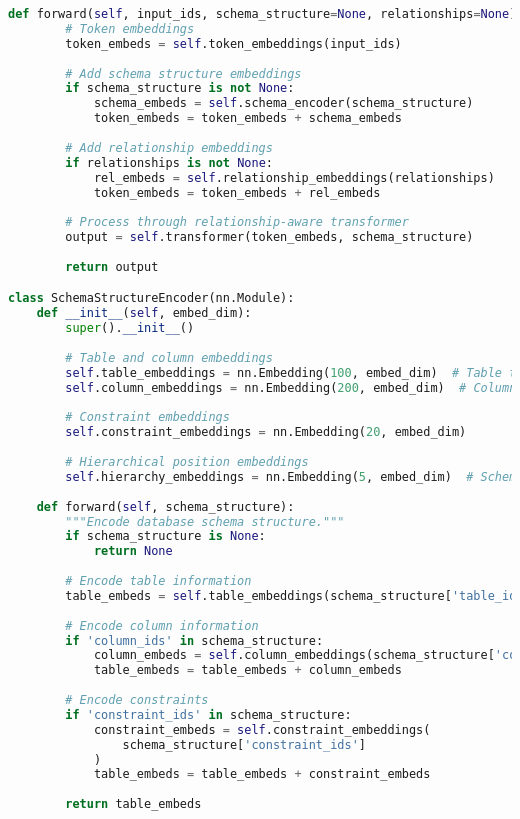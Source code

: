 \begin{lstlisting}[language=Python, caption=Schema-aware database tokenization system]
    def forward(self, input_ids, schema_structure=None, relationships=None):
        # Token embeddings
        token_embeds = self.token_embeddings(input_ids)
        
        # Add schema structure embeddings
        if schema_structure is not None:
            schema_embeds = self.schema_encoder(schema_structure)
            token_embeds = token_embeds + schema_embeds
        
        # Add relationship embeddings
        if relationships is not None:
            rel_embeds = self.relationship_embeddings(relationships)
            token_embeds = token_embeds + rel_embeds
        
        # Process through relationship-aware transformer
        output = self.transformer(token_embeds, schema_structure)
        
        return output

class SchemaStructureEncoder(nn.Module):
    def __init__(self, embed_dim):
        super().__init__()
        
        # Table and column embeddings
        self.table_embeddings = nn.Embedding(100, embed_dim)  # Table types
        self.column_embeddings = nn.Embedding(200, embed_dim)  # Column types
        
        # Constraint embeddings
        self.constraint_embeddings = nn.Embedding(20, embed_dim)
        
        # Hierarchical position embeddings
        self.hierarchy_embeddings = nn.Embedding(5, embed_dim)  # Schema levels
        
    def forward(self, schema_structure):
        """Encode database schema structure."""
        if schema_structure is None:
            return None
        
        # Encode table information
        table_embeds = self.table_embeddings(schema_structure['table_ids'])
        
        # Encode column information
        if 'column_ids' in schema_structure:
            column_embeds = self.column_embeddings(schema_structure['column_ids'])
            table_embeds = table_embeds + column_embeds
        
        # Encode constraints
        if 'constraint_ids' in schema_structure:
            constraint_embeds = self.constraint_embeddings(
                schema_structure['constraint_ids']
            )
            table_embeds = table_embeds + constraint_embeds
        
        return table_embeds


\end{lstlisting}
